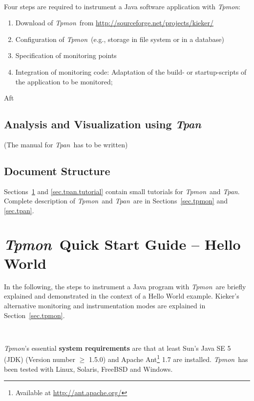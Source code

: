 \documentclass[a4paper,12pt]{scrartcl}
\newcommand{\tpmon}{\textit{Tpmon}}
\newcommand{\tpan}{\textit{Tpan}}
\newcommand{\kiekerurl}{\small\url{http://sourceforge.net/projects/kieker/}\normalsize}
\begin{document}
\

Four steps are required to instrument a Java software application with \tpmon:
\begin{enumerate}
\item Download of \tpmon\ from \kiekerurl
\item Configuration of \tpmon\  (e.g., storage in file system or in a database)
\item Specification of monitoring points 
\item Integration of monitoring code: Adaptation of the build- or startup-scripts of the application to be monitored; 
\end{enumerate}

Aft

\subsection{Analysis and Visualization using \tpan}

(The manual for \tpan\ has to be written)

\subsection{Document Structure}

Sections~\ref{sec.tpmon.tutorial} and \ref{sec.tpan.tutorial} contain small tutorials for \tpmon\ and \tpan. Complete description of \tpmon\ and \tpan\ are in Sections~\ref{sec.tpmon} and \ref{sec.tpan}. %

\section{\tpmon\ Quick Start Guide -- Hello World}\label{sec.tpmon.tutorial}
In the following, the steps to instrument a Java program with \tpmon\ are briefly explained and demonstrated in the context of a Hello World example. Kieker's alternative monitoring and instrumentation modes are explained in Section~\ref{sec.tpmon}.

\

\tpmon's essential \textbf{system requirements} are that at least Sun's Java SE 5 (JDK) (Version number $\geq$ 1.5.0) and Apache Ant\footnote{Available at \url{http://ant.apache.org/}} 1.7 are installed. \tpmon\ has been tested with Linux, Solaris, FreeBSD and Windows.
\end{document}
